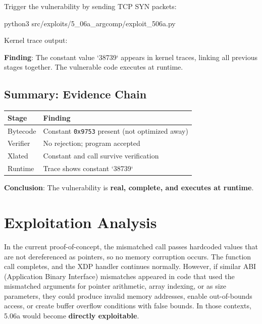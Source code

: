 Trigger the vulnerability by sending TCP SYN packets:
\begin{tcolorbox}[colback=gray!10, colframe=gray!10, arc=2pt, boxrule=0pt]
\small\ttfamily
python3 src/exploits/5\_06a\_argcomp/exploit\_506a.py 
\end{tcolorbox}

\noindent
Kernel trace output:

\vspace{0.3cm}
\noindent
{}
\vspace{0.3cm}

\noindent
\textbf{Finding}: The constant value `38739` appears in kernel traces, linking all previous stages together. The vulnerable code executes at runtime.

\subsection{Summary: Evidence Chain}

\begin{center}
\begin{tabular}{|l|l|}
\hline
\textbf{Stage} & \textbf{Finding} \\
\hline
Bytecode & Constant \texttt{0x9753} present (not optimized away) \\
Verifier & No rejection; program accepted \\
Xlated & Constant and call survive verification \\
Runtime & Trace shows constant `38739` \\
\hline
\end{tabular}
\end{center}

\noindent
\textbf{Conclusion}: The vulnerability is \textbf{real, complete, and executes at runtime}.

\section{Exploitation Analysis}

In the current proof-of-concept, the mismatched call passes hardcoded values that are not dereferenced as pointers, so no memory corruption occurs. The function call completes, and the XDP handler continues normally. However, if similar ABI (Application Binary Interface) mismatches appeared in code that used the mismatched arguments for pointer arithmetic, array indexing, or as size parameters, they could produce invalid memory addresses, enable out-of-bounds access, or create buffer overflow conditions with false bounds. In those contexts, 5.06a would become \textbf{directly exploitable}.

